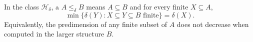 In the class $\mathcal{H}_\delta$, a  $A \leq_\delta B$ means $A \subseteq B$ and for every finite $X \subseteq A$,
$$\min\{\delta(Y) : X \subseteq Y \subseteq B \text{ finite}\} = \delta(X).$$
Equivalently, the predimension of any finite subset of $A$ does not decrease when computed in the larger structure $B$.
